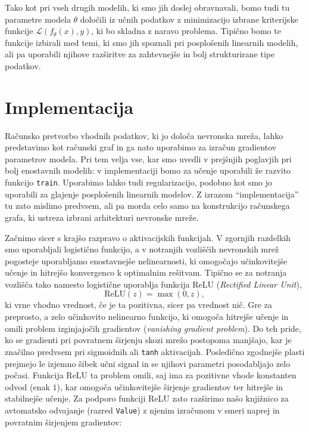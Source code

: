 Tako kot pri vseh drugih modelih, ki smo jih doslej obravnavali, bomo tudi tu parametre modela \(\theta\) določili iz učnih podatkov z minimizacijo izbrane kriterijske funkcije \( \mathcal{L}(f_{\theta}(x), y) \), ki bo skladna z naravo problema. Tipično bomo te funkcije izbirali med temi, ki smo jih spoznali pri posplošenih linearnih modelih, ali pa uporabili njihove razširitve za zahtevnejše in bolj strukturirane tipe podatkov.

\section{Implementacija}

Računsko pretvorbo vhodnih podatkov, ki jo določa nevronska mreža, lahko predstavimo kot računski graf in ga nato uporabimo za izračun gradientov parametrov modela. Pri tem velja vse, kar smo uvedli v prejšnjih poglavjih pri bolj enostavnih modelih: v implementaciji bomo za učenje uporabili že razvito funkcijo \texttt{train}. Uporabimo lahko tudi regularizacijo, podobno kot smo jo uporabili za glajenje posplošenih linearnih modelov. Z izrazom ``implementacija'' tu zato mislimo predvsem, ali pa morda celo samo na konstrukcijo računskega grafa, ki ustreza izbrani arhitekturi nevronske mreže.

Začnimo sicer s krajšo razpravo o aktivacijskih funkcijah. V zgornjih razdelkih smo uporabljali logistično funkcijo, a v notranjih vozliščih nevronskih mrež pogosteje uporabljamo enostavnejše nelinearnosti, ki omogočajo učinkovitejše učenje in hitrejšo konvergenco k optimalnim rešitvam. Tipično se za notranja vozlišča tako namesto logistične uporablja funkcija ReLU ({\em Rectified Linear Unit}), 
\[
\text{ReLU}(z) = \max(0, z),
\]
ki vrne vhodno vrednost, če je ta pozitivna, sicer pa vrednost nič. Gre za preprosto, a zelo učinkovito nelinearno funkcijo, ki omogoča hitrejše učenje in omili problem izginjajočih gradientov ({\em vanishing gradient problem}). Do teh pride, ko se gradienti pri povratnem širjenju skozi mrežo postopoma manjšajo, kar je značilno predvsem pri sigmoidnih ali \texttt{tanh} aktivacijah. Posledično zgodnejše plasti prejmejo le izjemno šibek učni signal in se njihovi parametri posodabljajo zelo počasi. Funkcija ReLU ta problem omili, saj ima za pozitivne vhode konstanten odvod (enak \(1\)), kar omogoča učinkovitejše širjenje gradientov ter hitrejše in stabilnejše učenje. Za podporo funkciji ReLU zato razširimo našo knjižnico za avtomatsko odvajanje (razred \texttt{Value}) z njenim izračunom v smeri naprej in povratnim širjenjem gradientov:

